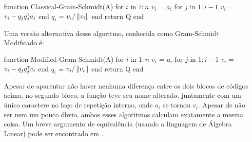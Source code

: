 

\begin{code}
function Classical-Gram-Schmidt(A)
    for $i$ in $1:n$
        $v_i$ = $a_i$
        for $j$ in $1:i-1$
            $v_i$ = $v_i - q_j q_j^{\scriptscriptstyle\mathsf{T}\mkern-1mu} a_i$
        end
        $q_i$ = $v_i / \left\lVert v_i\right\rVert$
    end
    return Q
end
\end{code}

Uma versão alternativa desse algoritmo, conhecida como Gram-Schmidt Modificado é:

\begin{code}
function Modified-Gram-Schmidt(A)
    for $i$ in $1:n$
        $v_i$ = $a_i$
        for $j$ in $1:i-1$
            $v_i$ = $v_i - q_j q_j^{\scriptscriptstyle\mathsf{T}\mkern-1mu} v_i$
        end
        $q_i$ = $v_i / \left\lVert v_i\right\rVert$
    end
    return Q
end
\end{code}

Apesar de aparentar não haver nenhuma diferença entre os dois blocos de códigos acima, no segundo bloco, a função teve seu nome alterado, juntamente com um único caractere no laço de repetição interno, onde $a_i$ se tornou $v_i$. Apesar de não ser nem um pouco óbvio, ambos esses algoritmos calculam exatamente a mesma coisa. Um breve argumento de equivalência (usando a linguagem de Álgebra Linear) pode ser encontrado em \cite{TrefethenBau1997}.
